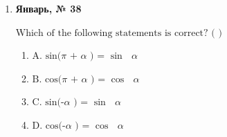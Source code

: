\begin{enumerate}
\begin{enumerate}
\end{enumerate}
\item \textbf{Январь, № 38} \par \smallskip
$\displaystyle \text{Which of the following statements is correct? ( )}$
\begin{enumerate}
\item $\displaystyle \text{A. sin(}\pi\text{  + }\alpha\text{ ) = }\sin\text{ }\alpha\text{ }$
\item $\displaystyle \text{B. cos(}\pi\text{  + }\alpha\text{ ) = }\cos\text{ }\alpha\text{ }$
\item $\displaystyle \text{C. sin(-}\alpha\text{ ) = }\sin\text{ }\alpha\text{ }$
\item $\displaystyle \text{D. cos(-}\alpha\text{ ) = }\cos\text{ }\alpha\text{ }$
\end{enumerate}
\end{enumerate}

